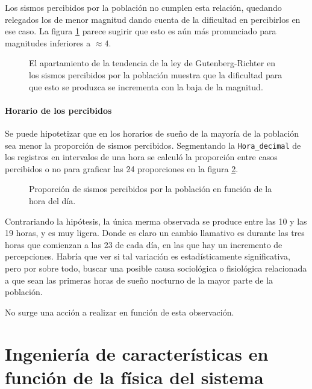 \documentclass[a4paper]{report}
\begin{document}
Los sismos percibidos por la población no cumplen esta relación, quedando relegados los de menor magnitud dando cuenta de la dificultad en percibirlos en ese caso.
La figura \ref{fig:acumulado_anual_magnitud_percibidos} parece sugirir que esto es aún más pronunciado para magnitudes inferiores a $\approx 4$.
\begin{figure}[!ht]
\centering

\caption{El apartamiento de la tendencia de la ley de Gutenberg-Richter en los sismos percibidos por la población muestra que la dificultad para que esto se produzca se incrementa con la baja de la magnitud.}
\label{fig:acumulado_anual_magnitud_percibidos}
\end{figure}



\paragraph{Horario de los percibidos}
Se puede hipotetizar que en los horarios de sueño de la mayoría de la población sea menor la proporción de sismos percibidos.
Segmentando la \verb'Hora_decimal' de los registros en intervalos de una hora se calculó la proporción entre casos percibidos o no para graficar las 24 proporciones en la figura \ref{fig:histograma_percibidos_por_hora}. 
\begin{figure}[!ht]
\centering

\caption{Proporción de sismos percibidos por la población en función de la hora del día.}
\label{fig:histograma_percibidos_por_hora}
\end{figure}

Contrariando la hipótesis, la única merma observada se produce entre las 10 y las 19 horas, y es muy ligera.
Donde es claro un cambio llamativo es durante las tres horas que comienzan a las 23 de cada día, en las que hay un incremento de percepciones. 
Habría que ver si tal variación es estadísticamente significativa, pero por sobre todo, buscar una posible causa sociológica o fisiológica relacionada a que sean las primeras horas de sueño nocturno de la mayor parte de la población.

No surge una acción a realizar en función de esta observación.




\section{Ingeniería de características en función de la física del sistema}\label{sec:ingeniería_física}
\end{document}

